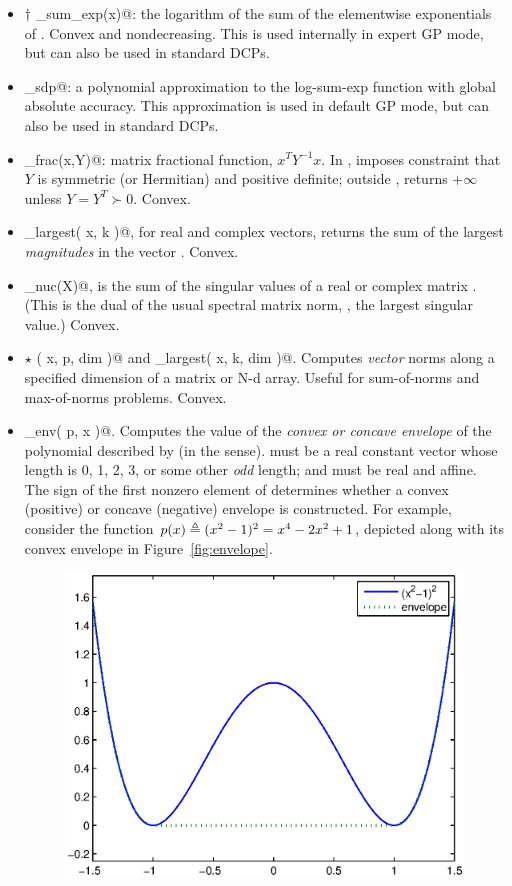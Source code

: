 \documentclass[12pt]{article}
\begin{document}
\begin{itemize}
\item $\dagger$ \verb@log_sum_exp(x)@: the
logarithm of the sum of the elementwise exponentials of \verb@x@.
Convex and nondecreasing.
This is used internally in expert GP mode, but can also be used in standard
DCPs.
\item \verb@logsumexp_sdp@: a polynomial approximation to the log-sum-exp
function with global absolute accuracy. 
This approximation is used in default GP
mode, but can also be used in standard DCPs.
\item \verb@matrix_frac(x,Y)@: matrix fractional function,
$x^TY^{-1}x$.  In \cvx, imposes constraint that $Y$ is 
symmetric (or Hermitian) and positive definite; outside \cvx,
returns $+\infty$ unless $Y=Y^T\succ 0$.
Convex. 
\item \verb@norm_largest( x, k )@, for real and complex vectors,
returns the sum of the largest \verb@k@ \emph{magnitudes} in the
vector \verb@x@.
Convex.
\item \verb@norm_nuc(X)@, 
is the sum of the singular values of a real or complex matrix \verb@X@.
(This is the dual of the usual spectral matrix norm, \ie,
the largest singular value.)
Convex.
\item $\star$ \verb@norms( x, p, dim )@ and \verb@norms_largest( x, k, dim )@.
Computes \emph{vector} norms along a specified dimension of a matrix
or N-d array. Useful for sum-of-norms and max-of-norms problems.
Convex.
\item \verb@poly_env( p, x )@. 
Computes the value of the \emph{convex or concave envelope} of the polynomial
described by \verb@p@ (in the \verb@polyval@ sense). \verb@p@ must be
a real constant vector whose length \verb@n@ is 0, 1, 2, 3, or some other
\emph{odd} length; and \verb@x@ must be real and affine. The sign of the
first nonzero element of \verb@p@ determines whether a convex (positive)
or concave (negative) envelope is constructed.
For example, consider the function $p(x)\triangleq (x^2-1)^2=x^4-2x^2+1$,
depicted along with its convex envelope in Figure~\ref{fig:envelope}.
\begin{figure}
\begin{center}
\includegraphics[width=4.5in]{envelope.eps}

\end{center}
\end{figure}
\end{itemize}
\end{document}
